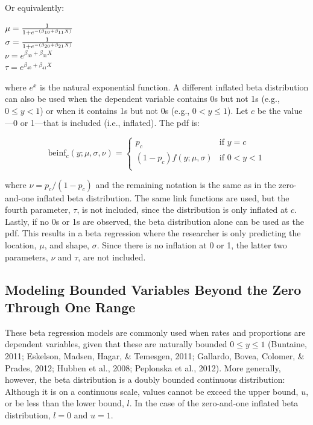 \documentclass[english,man]{apa6}
\theoremstyle{definition}
\theoremstyle{definition}
\theoremstyle{remark}
\begin{document}
Or equivalently:

\begin{center}
$\mu={1\over1+e^{-(\beta_{10}+\beta_{11}X)}}$\\
$\sigma={1\over1+e^{-(\beta_{20}+\beta_{21}X)}}$\\
$\nu = e^{\beta_{30} + \beta_{31}X}$\\
$\tau = e^{\beta_{40} + \beta_{41}X}$
\end{center}

where \(e^x\) is the natural exponential function. A different inflated
beta distribution can also be used when the dependent variable contains
0s but not 1s (e.g., \(0 \leq y < 1\)) or when it contains 1s but not 0s
(e.g., \(0 < y \leq 1\)). Let \(c\) be the value---0 or 1---that is
included (i.e., inflated). The pdf is:

\begin{center}
\[
\text{beinf}_c(y;\mu,\sigma,\nu) =
\begin{cases}
  p_c                             & \text{if } y = c\\
  (1 - p_c)f(y;\mu,\sigma)        & \text{if } 0 < y < 1\\
\end{cases}
\]
\end{center}

where \(\nu = p_c / (1 - p_c)\) and the remaining notation is the same
as in the zero-and-one inflated beta distribution. The same link
functions are used, but the fourth parameter, \(\tau\), is not included,
since the distribution is only inflated at \(c\). Lastly, if no 0s or 1s
are observed, the beta distribution alone can be used as the pdf. This
results in a beta regression where the researcher is only predicting the
location, \(\mu\), and shape, \(\sigma\). Since there is no inflation at
0 or 1, the latter two parameters, \(\nu\) and \(\tau\), are not
included.

\subsection{Modeling Bounded Variables Beyond the Zero Through One
Range}\label{modeling-bounded-variables-beyond-the-zero-through-one-range}

These beta regression models are commonly used when rates and
proportions are dependent variables, given that these are naturally
bounded \(0 \leq y \leq 1\) (Buntaine, 2011; Eskelson, Madsen, Hagar, \&
Temesgen, 2011; Gallardo, Bovea, Colomer, \& Prades, 2012; Hubben et
al., 2008; Peplonska et al., 2012). More generally, however, the beta
distribution is a doubly bounded continuous distribution: Although it is
on a continuous scale, values cannot be exceed the upper bound, \(u\),
or be less than the lower bound, \(l\). In the case of the zero-and-one
inflated beta distribution, \(l = 0\) and \(u = 1\).
\end{document}

